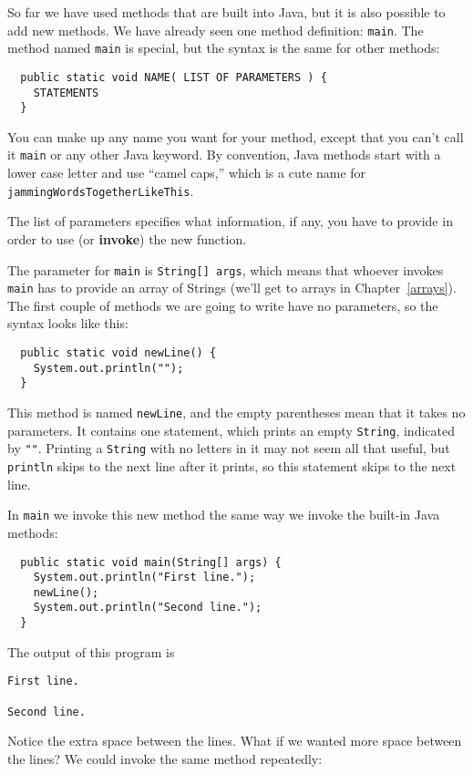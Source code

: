 \documentclass{book}
\begin{document}
So far we have used methods that are built into Java,
but it is also possible to add new methods.  We have already
seen one method definition: {\tt main}.  The method named {\tt main}
is special, but the syntax is the same for other methods:

\begin{verbatim}
  public static void NAME( LIST OF PARAMETERS ) {
    STATEMENTS
  }
\end{verbatim}
%
You can make up any name you want for your method, except
that you can't call it {\tt main} or any other
Java keyword.  By convention, Java methods start with a lower
case letter and use ``camel caps,'' which is a cute name for
{\tt jammingWordsTogetherLikeThis}.

The list of
parameters specifies what information, if any, you have to
provide in order to use (or {\bf invoke}) the new function.


The parameter for {\tt main} is {\tt String[] args}, which
means that whoever invokes {\tt main} has to provide an array of
Strings (we'll get to arrays in Chapter~\ref{arrays}).  The first
couple of methods we are going to write have no parameters, so the
syntax looks like this:

\begin{verbatim}
  public static void newLine() {
    System.out.println("");
  }
\end{verbatim}
%
This method is named {\tt newLine}, and the empty parentheses
mean that it takes no parameters.  It contains one
statement, which prints an empty {\tt String}, indicated by {\tt ""}.
Printing a {\tt String} with no letters in it may not seem all that
useful, but {\tt println} skips to the next
line after it prints, so this statement skips to the next line.

In {\tt main} we invoke this new method the same way we invoke the
built-in Java methods:

\begin{verbatim}
  public static void main(String[] args) {
    System.out.println("First line.");
    newLine();
    System.out.println("Second line.");
  }
\end{verbatim}
%
The output of this program is

\begin{verbatim}
First line.

Second line.
\end{verbatim}
%
Notice the extra space between the lines.  What if we wanted
more space between the lines?  We could invoke the same
method repeatedly:
\end{document}

